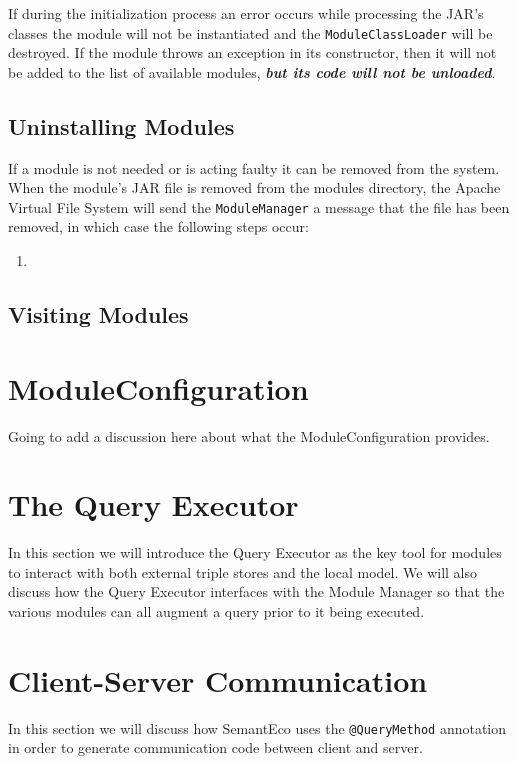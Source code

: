 \documentclass[letterpaper]{report}
\begin{document}
If during the initialization process an error occurs while processing the JAR's classes the module will not be instantiated and the \texttt{ModuleClassLoader} will be destroyed. If the module throws an exception in its constructor, then it will not be added to the list of available modules, \textbf{\textit{but its code will not be unloaded}}.

\subsection{Uninstalling Modules}
If a module is not needed or is acting faulty it can be removed from the system. When the module's JAR file is removed from the modules directory, the Apache Virtual File System will send the \texttt{ModuleManager} a message that the file has been removed, in which case the following steps occur:

\begin{enumerate}
\item 
\end{enumerate}

\subsection{Visiting Modules}

\section{ModuleConfiguration}
Going to add a discussion here about what the ModuleConfiguration provides.

\section{The Query Executor}
\label{query-executor}
In this section we will introduce the Query Executor as the key tool for modules to interact with both external triple stores and the local model. We will also discuss how the Query Executor interfaces with the Module Manager so that the various modules can all augment a query prior to it being executed.

\section{Client-Server Communication}
\label{client-server-comm}
In this section we will discuss how SemantEco uses the \texttt{@QueryMethod} annotation in order to generate communication code between client and server. 
\end{document}
